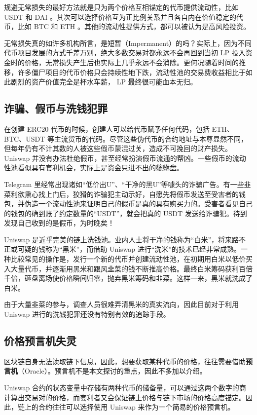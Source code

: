 \documentclass[12pt, a4paper, oneside]{ctexart}
\begin{document}
规避无常损失的最好方法就是只为两个价格互相锚定的代币提供流动性，比如 USDT 和 DAI 。其次可以选择价格互为正比例关系并且各自内在价值稳定的代币，比如 BTC 和 ETH 。其他的流动性提供方式，都可以被认为是高风险投资。

无常损失真的如许多机构所言，是短暂（Impermanent）的吗？实际上，因为不同代币项目发展的方式千差万别，绝大多数交易对都永远不会再回到当初 LP 投入资金时的价格，无常损失产生后也实际上几乎永远不会消除。更何况随着时间的推移，许多僵尸项目的代币价格只会持续性地下跌，流动性池的交易费收益相比于如此剧烈的资产价值完全是杯水车薪， LP 最终很可能血本无归。

\subsection{诈骗、假币与洗钱犯罪}

在创建 ERC20 代币的时候，创建人可以给代币赋予任何代码，包括 ETH、BTC、USDT 等主流货币的代码。尽管这些伪代币的合约地址与本尊显然不同，但每年仍有不计其数的人被这些假币蒙混过关，造成不可挽回的财产损失。 Uniswap 并没有办法杜绝假币，甚至经常扮演假币流通的帮凶。一些假币的流动性池看似具有套利机会，实际上是资金只进不出的貔貅盘。

Telegram 里经常出现诸如“低价出U”、“干净的黑U”等噱头的诈骗广告。有一些韭菜利欲熏心找上门后，狡猾的诈骗犯主动示好，自愿先将假币发送至受害者的钱包，并伪造一个流动性池来证明自己的假币是真的具有购买力的。受害者看见自己的钱包的确到账了约定数量的“USDT”，就会把真的 USDT 发送给诈骗犯。待到发现自己收到的是假币，为时晚矣！

Uniswap 是近乎完美的链上洗钱池。业内人士将干净的钱称为“白米”，将来路不正或可疑的钱称为“黑米”，而借助 Uniswap 进行“洗米”的技术已经非常成熟。一种比较常见的操作是，发行一个新的代币并创建流动性池，在初期用白米以低价买入大量代币，并逐渐用黑米和跟风韭菜的钱不断推高价格。最终白米筹码获利百倍千倍，砸盘离场使价格瞬间归零，抛弃黑米筹码和韭菜。这样一来，黑米就洗成了白米。

由于大量韭菜的参与，调查人员很难弄清黑米的真实流向，因此目前对于利用 Uniswap 进行的洗钱犯罪还没有特别有效的追踪手段。

\subsection{价格预言机失灵}

区块链自身无法读取链下信息，因此，想要获取某种代币的价格，往往需要借助\textbf{预言机}（Oracle）。预言机不是本文探讨的重点，因此不多加以介绍。

Uniswap 合约的状态变量中存储有两种代币的储备量，可以通过这两个数字的商计算出交易对的价格，而套利者又会保证链上价格与链下市场的价格高度锚定。因此，链上的合约往往可以选择使用 Uniswap 来作为一个简易的价格预言机。
\end{document}
